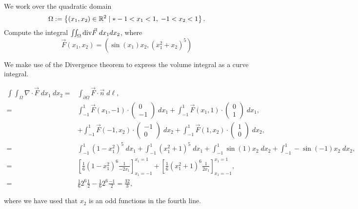 \documentclass[11pt]{article}
\begin{document}
\begin{exercise}
    We work over the quadratic domain 
    \[
        \Omega := \left\{ (x_1,x_2) \in \bbR^{2} \suchthat* -1 < x_1 < 1, \; -1 < x_2 < 1 \right\}.
    \]
    Compute the integral $\iint_\Omega \mathrm{div} \vec F \;dx_1dx_2$, where 
    \[
        \vec F(x_1,x_2) = \left( \sin(x_1) x_2, \left( x_1^2 + x_2 \right)^5 \right)
    \]
\end{exercise}
\begin{solution}
 We make use of the Divergence theorem to express the volume integral as a curve integral.

\begin{align*}
\int \int_{\Omega} \nabla \cdot \vec{F} \;d x_1 \:d x_2 =&\int_{\partial \Omega}\vec{F}\cdot\vec{n} \;d\ell,\\
=&\int_{-1}^1 \vec{F}(x_1,-1)\cdot\begin{pmatrix}0\\-1\end{pmatrix} \;dx_1 + \int_{-1}^1 \vec{F}(x_1,1)\cdot\begin{pmatrix}0\\1\end{pmatrix} \;dx_1,\\
& + \int_{-1}^1 \vec{F}(-1,x_2)\cdot\begin{pmatrix}-1\\0\end{pmatrix} \;dx_2 + \int_{-1}^1 \vec{F}(1,x_2)\cdot\begin{pmatrix}1\\0\end{pmatrix} \;dx_2,\\
=&\int_{-1}^1 (1-x_1^ 2)^ 5 \;dx_1 + \int_{-1}^1 (x_1^2 + 1)^ 5 \;dx_1 + \int_{-1}^1 \sin(1)x_2\;dx_2 +  \int_{-1}^1 -\sin(-1)x_2\;dx_2,\\
=&  \left[\frac{1}{6}(1-x_1^ 2)^ 6 \frac{1}{-2x_1} \right]_{x_1 = -1}^{x_1 = 1} + \left[\frac{1}{6}(x_1^ 2 + 1)^ 6 \frac{1}{2x_1} \right]_{x_1 = -1}^{x_1 = 1},\\
=& \frac{1}{6} 2^ 6 \frac{1}{2} - \frac{1}{6} 2^6 \frac{-1}{2} = \frac{32}{3},
\end{align*}

where we have used that $x_2$ is an odd functions in the fourth line. 
\end{solution}
\end{document}
